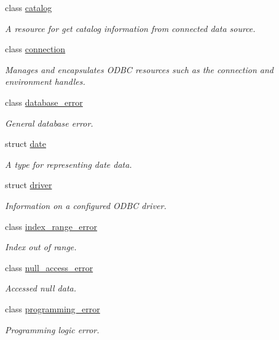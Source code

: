 \begin{DoxyCompactItemize}
\item 
class \mbox{\hyperlink{classnanodbc_1_1catalog}{catalog}}
\begin{DoxyCompactList}\small\item\em A resource for get catalog information from connected data source. \end{DoxyCompactList}\item 
class \mbox{\hyperlink{classnanodbc_1_1connection}{connection}}
\begin{DoxyCompactList}\small\item\em Manages and encapsulates O\+D\+BC resources such as the connection and environment handles. \end{DoxyCompactList}\item 
class \mbox{\hyperlink{classnanodbc_1_1database__error}{database\+\_\+error}}
\begin{DoxyCompactList}\small\item\em General database error. \end{DoxyCompactList}\item 
struct \mbox{\hyperlink{structnanodbc_1_1date}{date}}
\begin{DoxyCompactList}\small\item\em A type for representing date data. \end{DoxyCompactList}\item 
struct \mbox{\hyperlink{structnanodbc_1_1driver}{driver}}
\begin{DoxyCompactList}\small\item\em Information on a configured O\+D\+BC driver. \end{DoxyCompactList}\item 
class \mbox{\hyperlink{classnanodbc_1_1index__range__error}{index\+\_\+range\+\_\+error}}
\begin{DoxyCompactList}\small\item\em Index out of range. \end{DoxyCompactList}\item 
class \mbox{\hyperlink{classnanodbc_1_1null__access__error}{null\+\_\+access\+\_\+error}}
\begin{DoxyCompactList}\small\item\em Accessed null data. \end{DoxyCompactList}\item 
class \mbox{\hyperlink{classnanodbc_1_1programming__error}{programming\+\_\+error}}
\begin{DoxyCompactList}\small\item\em Programming logic error. \end{DoxyCompactList}\item 

\end{DoxyCompactItemize}
